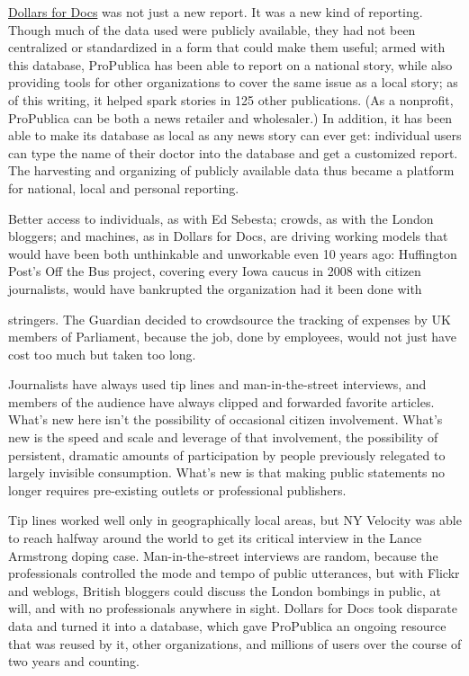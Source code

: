 \begin{itemize}
\href{http://projects.propublica.org/docdollars/}{Dollars for Docs} was not just a new report. It was a new kind of reporting.
Though much of the data used were publicly available, they
had not been centralized or standardized in a form that could make
them useful; armed with this database, ProPublica has been able to report
on a national story, while also providing tools for other organizations
to cover the same issue as a local story; as of this writing, it helped
spark stories in 125 other publications. (As a nonprofit, ProPublica can
be both a news retailer and wholesaler.) In addition, it has been able
to make its database as local as any news story can ever get: individual
users can type the name of their doctor into the database and get a
customized report. The harvesting and organizing of publicly available
data thus became a platform for national, local and personal reporting.
\end{itemize}

Better access to individuals, as with Ed Sebesta; crowds, as with the London
bloggers; and machines, as in Dollars for Docs, are driving working models that
would have been both unthinkable and unworkable even 10 years ago: Huffington
Post’s Off the Bus project, covering every Iowa caucus in 2008 with citizen
journalists, would have bankrupted the organization had it been done with

stringers. The Guardian decided to crowdsource the tracking of expenses by UK
members of Parliament, because the job, done by employees, would not just have
cost too much but taken too long.

Journalists have always used tip lines and man-in-the-street interviews, and members
of the audience have always clipped and forwarded favorite articles. What’s
new here isn’t the possibility of occasional citizen involvement. What’s new is the
speed and scale and leverage of that involvement, the possibility of persistent, dramatic
amounts of participation by people previously relegated to largely invisible
consumption. What’s new is that making public statements no longer requires
pre-existing outlets or professional publishers.

Tip lines worked well only in geographically local areas, but NY Velocity was
able to reach halfway around the world to get its critical interview in the Lance
Armstrong doping case. Man-in-the-street interviews are random, because the
professionals controlled the mode and tempo of public utterances, but with Flickr
and weblogs, British bloggers could discuss the London bombings in public, at
will, and with no professionals anywhere in sight. Dollars for Docs took disparate
data and turned it into a database, which gave ProPublica an ongoing resource
that was reused by it, other organizations, and millions of users over the course
of two years and counting.

